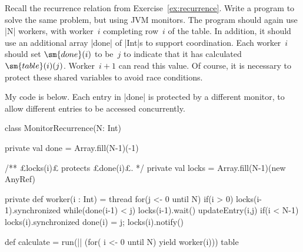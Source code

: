 \begin{question}
Recall the recurrence relation from Exercise~\ref{ex:recurrence}.  Write a
program to solve the same problem, but using JVM monitors.  The program should
again use |N| workers, with worker~$i$ completing row~$i$ of the table.  In
addition, it should use an additional array |done| of |Int|s to support
coordination.  Each worker~$i$ should set $\sm{done}(i)$ to be~$j$ to indicate
that it has calculated $\sm{table}(i)(j)$.  Worker~$i+1$ can read this value.
Of course, it is necessary to protect these shared variables to avoid race
conditions.
\end{question}


\begin{answerI}
My code is below.  Each entry in |done| is protected by a different monitor,
to allow different entries to be accessed concurrently.
%
\begin{scala}
class MonitorRecurrence(N: Int){
  private val done = Array.fill(N-1)(-1)

  /** £locks(i)£ protects £done(i)£. */
  private val locks = Array.fill(N-1)(new AnyRef)

  private def worker(i : Int) = thread{
    for(j <- 0 until N){
      if(i > 0) locks(i-1).synchronized{ while(done(i-1) < j) locks(i-1).wait() }
      updateEntry(i,j)
      if(i < N-1) locks(i).synchronized{ done(i) = j; locks(i).notify() }
    }
  }

  def calculate = {
    run(|| (for( i <- 0 until N) yield worker(i)))
    table
  }
}
\end{scala}
\end{answerI}
